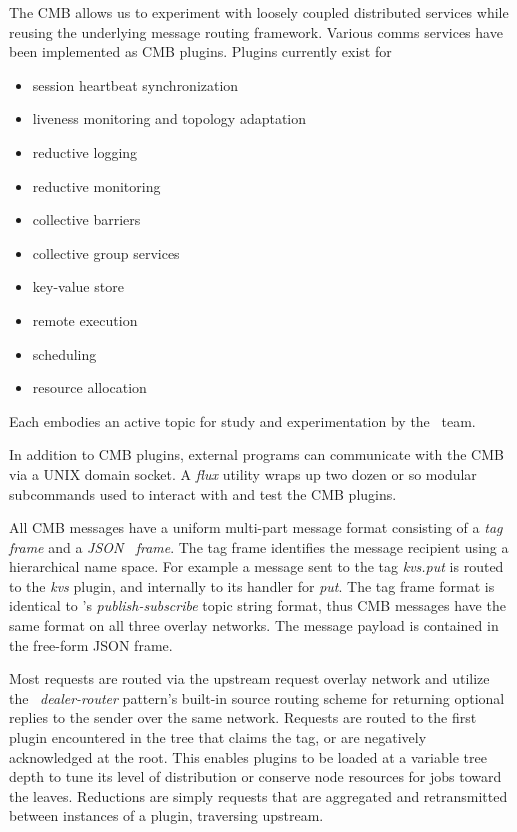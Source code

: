 The CMB allows us to experiment with loosely coupled distributed services
while reusing the underlying message routing framework.  Various comms
services have been implemented as CMB plugins.  Plugins currently exist for
\begin{itemize}
\item{session heartbeat synchronization}
\item{liveness monitoring and topology adaptation}
\item{reductive logging}
\item{reductive monitoring}
\item{collective barriers}
\item{collective group services}
\item{key-value store}
\item{remote execution}
\item{scheduling}
\item{resource allocation}
\end{itemize}
Each embodies an active topic for study and experimentation by the \flux\ team.

In addition to CMB plugins, external programs can communicate with the CMB
via a UNIX domain socket.  A {\em flux} utility wraps up two dozen or so
modular subcommands used to interact with and test the CMB plugins.

All CMB messages have a uniform multi-part message format consisting of
a {\em tag frame} and a {\em JSON~\cite{rfc4627} frame}.  The tag frame identifies the
message recipient using a hierarchical name space.  For example a message
sent to the tag {\em kvs.put} is routed to the {\em kvs} plugin, and internally
to its handler for {\em put}.  The tag frame format is identical to
\zMQ's {\em publish-subscribe} topic string format, thus CMB messages
have the same format on all three overlay networks.
The message payload is contained in the free-form JSON frame.

Most requests are routed via the upstream request overlay network
and utilize the \zMQ\ {\em dealer-router} pattern's built-in source routing
scheme for returning optional replies to the sender over the same network.
Requests are routed to the first plugin encountered in the tree that claims
the tag, or are negatively acknowledged at the root.  This enables plugins
to be loaded at a variable tree depth to tune its level of distribution
or conserve node resources for jobs toward the leaves.
Reductions are simply requests that are aggregated and retransmitted between
instances of a plugin, traversing upstream.


